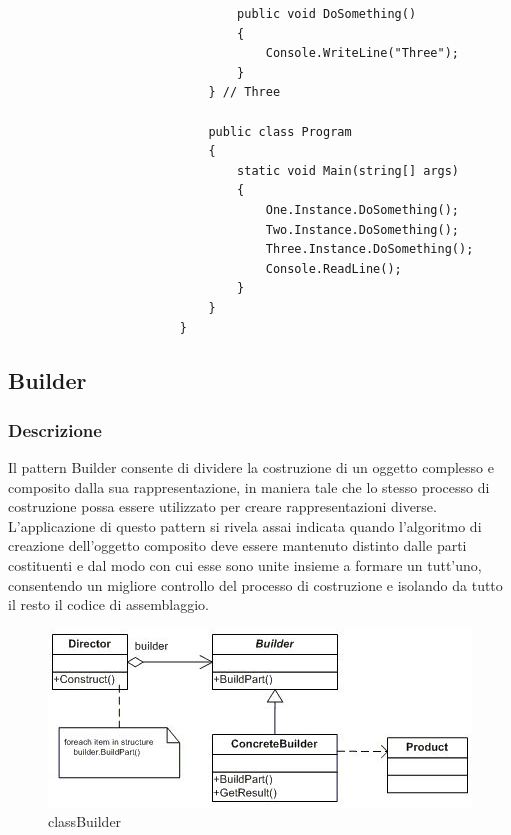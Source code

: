 \documentclass[a4paper,10pt]{article}
\begin{document}
\begin{lstlisting}
                                public void DoSomething()
                                {
                                    Console.WriteLine("Three");
                                }
                            } // Three
                        
                            public class Program
                            {
                                static void Main(string[] args)
                                {
                                    One.Instance.DoSomething();
                                    Two.Instance.DoSomething();
                                    Three.Instance.DoSomething();
                                    Console.ReadLine();
                                }
                            }
                        }
                    \end{lstlisting}
                \newpage
                \subsection{Builder}
                \subsubsection{Descrizione}
                Il pattern Builder consente di dividere la costruzione di un oggetto complesso e composito dalla sua rappresentazione, in maniera tale che lo stesso processo di costruzione possa essere utilizzato per creare rappresentazioni diverse. L’applicazione di questo pattern si rivela assai indicata quando l’algoritmo di creazione dell’oggetto composito deve essere mantenuto distinto dalle parti costituenti e dal modo con cui esse sono unite insieme a formare un tutt’uno, consentendo un migliore controllo del processo di costruzione e isolando da tutto il resto il codice di assemblaggio.

                \begin{figure}[h!] %
                    \centering
                    \includegraphics[scale=0.70]{img/IC106751}
                    \caption{classBuilder}
                \end{figure}
    
\end{document}
